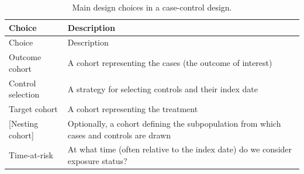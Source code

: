 \documentclass[]{book}
\begin{document}
\begin{longtable}[]{@{}ll@{}}
\caption{\label{tab:ccChoices} Main design choices in a case-control
design.}\tabularnewline
\toprule
\begin{minipage}[b]{0.23\columnwidth}\raggedright\strut
Choice\strut
\end{minipage} & \begin{minipage}[b]{0.71\columnwidth}\raggedright\strut
Description\strut
\end{minipage}\tabularnewline
\midrule
\endfirsthead
\toprule
\begin{minipage}[b]{0.23\columnwidth}\raggedright\strut
Choice\strut
\end{minipage} & \begin{minipage}[b]{0.71\columnwidth}\raggedright\strut
Description\strut
\end{minipage}\tabularnewline
\midrule
\endhead
\begin{minipage}[t]{0.23\columnwidth}\raggedright\strut
Outcome cohort\strut
\end{minipage} & \begin{minipage}[t]{0.71\columnwidth}\raggedright\strut
A cohort representing the cases (the outcome of interest)\strut
\end{minipage}\tabularnewline
\begin{minipage}[t]{0.23\columnwidth}\raggedright\strut
Control selection\strut
\end{minipage} & \begin{minipage}[t]{0.71\columnwidth}\raggedright\strut
A strategy for selecting controls and their index date\strut
\end{minipage}\tabularnewline
\begin{minipage}[t]{0.23\columnwidth}\raggedright\strut
Target cohort\strut
\end{minipage} & \begin{minipage}[t]{0.71\columnwidth}\raggedright\strut
A cohort representing the treatment\strut
\end{minipage}\tabularnewline
\begin{minipage}[t]{0.23\columnwidth}\raggedright\strut
{[}Nesting cohort{]}\strut
\end{minipage} & \begin{minipage}[t]{0.71\columnwidth}\raggedright\strut
Optionally, a cohort defining the subpopulation from which cases and
controls are drawn\strut
\end{minipage}\tabularnewline
\begin{minipage}[t]{0.23\columnwidth}\raggedright\strut
Time-at-risk\strut
\end{minipage} & \begin{minipage}[t]{0.71\columnwidth}\raggedright\strut
At what time (often relative to the index date) do we consider exposure
status?\strut
\end{minipage}\tabularnewline
\bottomrule
\end{longtable}
\end{document}
